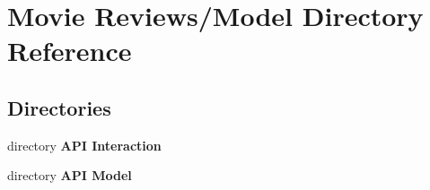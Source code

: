 \section{Movie Reviews/\+Model Directory Reference}
\label{dir_ce5e329d3faf820601e4a6725d769431}
\subsection*{Directories}
\begin{DoxyCompactItemize}
\item 
directory {\bf A\+P\+I Interaction}
\item 
directory {\bf A\+P\+I Model}
\end{DoxyCompactItemize}
